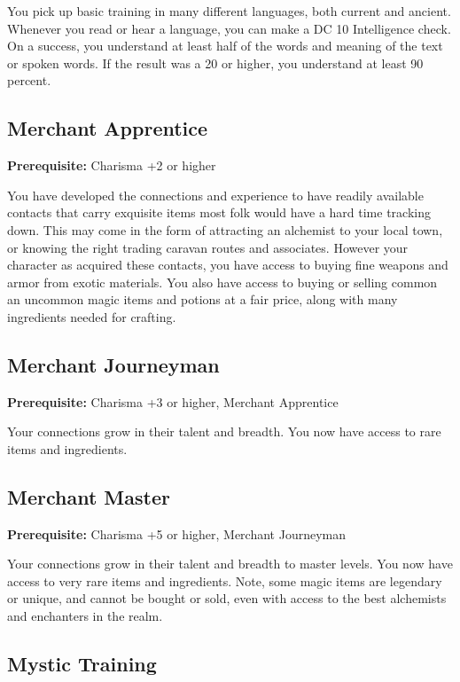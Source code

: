 \documentclass[12pt,letterpaper,twocolumn,openany,nodeprecatedcode,bg=none]{dndbook}
\let\oldsubsection\subsection
\renewcommand{\subsection}[1]{%
  \needspace{5\baselineskip}%
  \oldsubsection{#1}%
}
\begin{document}
You pick up basic training in many different languages, both current and
ancient. Whenever you read or hear a language, you can make a DC 10
Intelligence check. On a success, you understand at least half of the
words and meaning of the text or spoken words. If the result was a 20 or
higher, you understand at least 90 percent.

\subsection{Merchant Apprentice}\label{merchant-apprentice}

\textbf{Prerequisite:} Charisma +2 or higher

You have developed the connections and experience to have readily
available contacts that carry exquisite items most folk would have a
hard time tracking down. This may come in the form of attracting an
alchemist to your local town, or knowing the right trading caravan
routes and associates. However your character as acquired these
contacts, you have access to buying fine weapons and armor from exotic
materials. You also have access to buying or selling common an uncommon
magic items and potions at a fair price, along with many ingredients
needed for crafting.

\subsection{Merchant Journeyman}\label{merchant-journeyman}

\textbf{Prerequisite:} Charisma +3 or higher, Merchant Apprentice

Your connections grow in their talent and breadth. You now have access
to rare items and ingredients.

\subsection{Merchant Master}\label{merchant-master}

\textbf{Prerequisite:} Charisma +5 or higher, Merchant Journeyman

Your connections grow in their talent and breadth to master levels. You
now have access to very rare items and ingredients. Note, some magic
items are legendary or unique, and cannot be bought or sold, even with
access to the best alchemists and enchanters in the realm.

\subsection{Mystic Training}\label{mystic-training}
\end{document}
